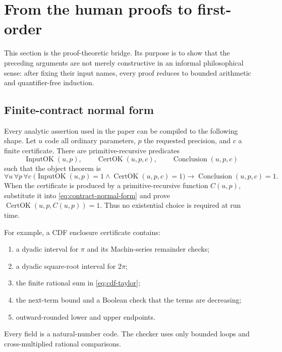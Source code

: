 \section{From the human proofs to first-order \ipra}\label{sec:internalization}

This section is the proof-theoretic bridge.  Its purpose is to show that the preceding arguments are not merely constructive in an informal philosophical sense: after fixing their input names, every proof reduces to bounded arithmetic and quantifier-free induction.

\subsection{Finite-contract normal form}

Every analytic assertion used in the paper can be compiled to the following shape.  Let $u$ code all ordinary parameters, $p$ the requested precision, and $c$ a finite certificate.  There are primitive-recursive predicates
\[
 \operatorname{InputOK}(u,p),
 \qquad
 \operatorname{CertOK}(u,p,c),
 \qquad
 \operatorname{Conclusion}(u,p,c)
\]
such that the object theorem is
\begin{equation}\label{eq:contract-normal-form}
 \forall u\,\forall p\,\forall c\;
 \bigl(\operatorname{InputOK}(u,p)=1\wedge
       \operatorname{CertOK}(u,p,c)=1\bigr)
 \to \operatorname{Conclusion}(u,p,c)=1.
\end{equation}
When the certificate is produced by a primitive-recursive function $C(u,p)$, substitute it into \eqref{eq:contract-normal-form} and prove
$\operatorname{CertOK}(u,p,C(u,p))=1$.  Thus no existential choice is required at run time.

For example, a CDF enclosure certificate contains:
\begin{enumerate}[label=(\roman*)]
  \item a dyadic interval for $\pi$ and its Machin-series remainder checks;
  \item a dyadic square-root interval for $2\pi$;
  \item the finite rational sum in \eqref{eq:cdf-taylor};
  \item the next-term bound and a Boolean check that the terms are decreasing;
  \item outward-rounded lower and upper endpoints.
\end{enumerate}
Every field is a natural-number code.  The checker uses only bounded loops and cross-multiplied rational comparisons.

